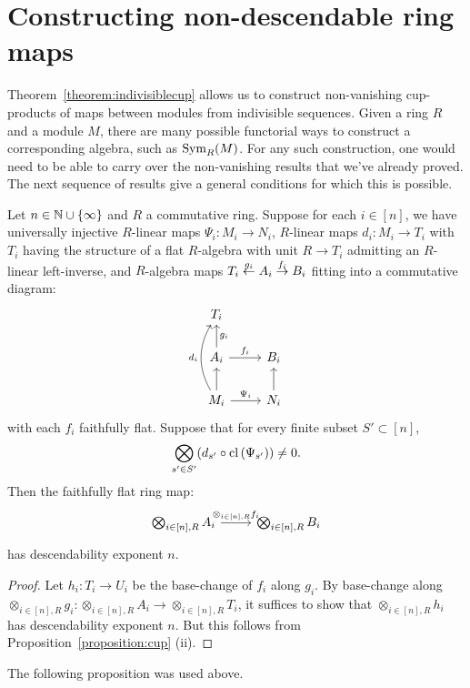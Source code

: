 \section{Constructing non-descendable ring maps}
Theorem~\ref{theorem:indivisiblecup} allows us to construct non-vanishing cup-products of maps between modules from indivisible sequences.
Given a ring $R$ and a module $M$, there are many possible functorial ways to construct a corresponding algebra, such as $\Sym_R(M)$. 
For any such construction, one would need to be able to carry over the non-vanishing results that we've already proved. The next sequence of results
give a general conditions for which this is possible.
\begin{proposition}\label{proposition:modalg}
Let $n \in \bb{N} \cup \{\infty\}$ and $R$ a commutative ring. Suppose for each $i \in [n]$, we have universally injective $R$-linear maps
 $\Psi_i: M_i \to N_i$, $R$-linear maps $d_i: M_i \to T_i$ with $T_i$ having the structure of a flat $R$-algebra with unit $R \to T_i$ 
 admitting an $R$-linear left-inverse, 
 and $R$-algebra maps 
 $T_i \over{g_i}{\leftarrow} A_i \over{f_i}{\to} B_i$ fitting into a commutative diagram:
\[\begin{tikzcd}
T_i&\\
A_i \arrow[u, "g_i", swap] \arrow[r, "f_i"] & B_i \\
M_i \arrow[u] \arrow[uu, bend left, "d_i"] \arrow[r, "\Psi_{i}"] & N_i \arrow[u]
\end{tikzcd}\]
with each $f_i$ faithfully flat. Suppose that for every finite subset $S' \subset [n]$,
\[\bigotimes_{s'\in S'} (d_{s'} \circ \cl{\Psi_{s'}}) \neq 0.\]
Then the faithfully flat ring map:
\[\begin{tikzcd}\bigotimes_{i \in [n], R} A_i \arrow[r, "\otimes_{i \in [n],R} f_i"]& \bigotimes_{i \in [n],R} B_i\end{tikzcd}\]
has descendability exponent $n$.
\end{proposition}
\begin{proof}
Let $h_i: T_i \to U_i$ be the base-change of $f_i$ along $g_i$. By base-change along 
$\otimes_{i \in [n], R} g_i : \otimes_{i \in [n], R} A_i \to \otimes_{i \in [n], R} T_i$, 
it suffices to show that $\otimes_{i \in [n], R} h_i$ has descendability exponent $n$. But this follows from
Proposition~\ref{proposition:cup} (ii).
\end{proof}
The following proposition was used above.
